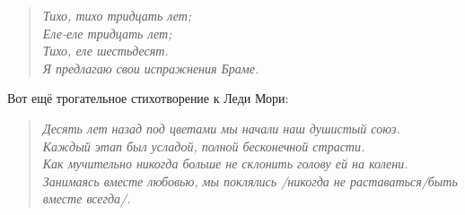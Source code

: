 \begin{ver}[1]
  \begin{verse}\it
    Тихо, тихо тридцать лет;\\
    Еле-еле тридцать лет;\\
    Тихо, еле шестьдесят.\\
    Я предлагаю свои испражнения Браме.
  \end{verse}
\end{ver}

\begin{ver}
  Вот ещё трогательное стихотворение к Леди Мори:
\end{ver}

\begin{ver}
  \begin{verse}\it
    Десять лет назад под цветами мы начали наш душистый
    союз.\\
    Каждый этап был усладой, полной бесконечной
    страсти.\\
    Как мучительно никогда больше не склонить голову ей на
    колени.\\
    Занимаясь вместе любовью, мы поклялись /никогда не раставаться/быть
    вместе всегда/.
  \end{verse}
\end{ver}


